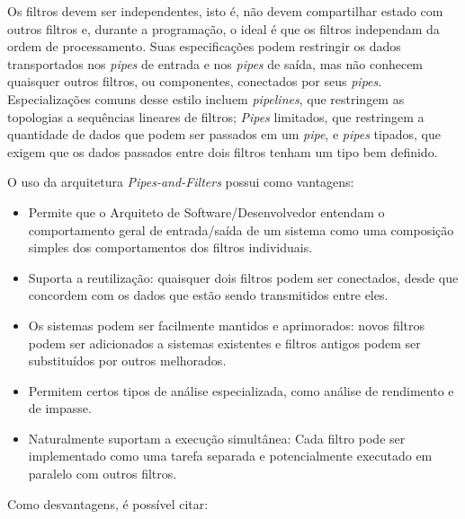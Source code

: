 \documentclass[portugues]{ic-tese}
\begin{document}
Os filtros devem ser independentes, isto é, não devem compartilhar estado com outros filtros e, durante a programação, o ideal é que os filtros independam da ordem de processamento. Suas especificações podem restringir os dados transportados nos \textit{pipes} de entrada e nos \textit{pipes} de saída, mas não conhecem quaisquer outros filtros, ou componentes, conectados por seus \textit{pipes}. Especializações comuns desse estilo incluem \textit{pipelines}, que restringem as topologias a sequências lineares de filtros; \textit{Pipes} limitados, que restringem a quantidade de dados que podem ser passados em um \textit{pipe}, e \textit{pipes} tipados, que exigem que os dados passados entre dois filtros tenham um tipo bem definido.

O uso da arquitetura \textit{Pipes-and-Filters} possui como vantagens:

\begin{itemize}
\item Permite que o Arquiteto de Software/Desenvolvedor entendam o comportamento geral de entrada/saída de um sistema como uma composição simples dos comportamentos dos filtros individuais.
\item Suporta a reutilização: quaisquer dois filtros podem ser conectados, desde que concordem com os dados que estão sendo transmitidos entre eles. 
\item Os sistemas podem ser facilmente mantidos e aprimorados: novos filtros podem ser adicionados a sistemas existentes e filtros antigos podem ser substituídos por outros melhorados.
\item Permitem certos tipos de análise especializada, como análise de rendimento e de impasse.
\item Naturalmente suportam a execução simultânea: Cada filtro pode ser implementado como uma tarefa separada e potencialmente executado em paralelo com outros filtros.
\end{itemize}

Como desvantagens, é possível citar:
\end{document}
